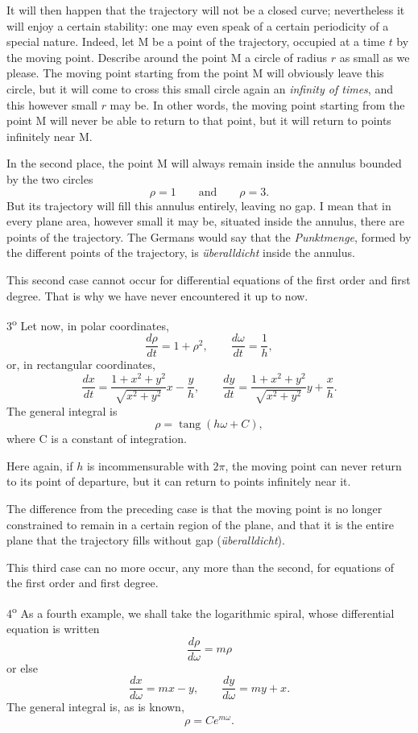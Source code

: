\documentclass[11pt]{article}
\begin{document}
It will then happen that the trajectory will not be a closed curve; nevertheless it will enjoy a certain stability: one may even speak of a certain periodicity of a special nature. Indeed, let M be a point of the trajectory, occupied at a time $t$ by the moving point. Describe around the point M a circle of radius $r$ as small as we please. The moving point starting from the point M will obviously leave this circle, but it will come to cross this small circle again an \emph{infinity of times}, and this however small $r$ may be. In other words, the moving point starting from the point M will never be able to return to that point, but it will return to points infinitely near M.

In the second place, the point M will always remain inside the annulus bounded by the two circles
\[
\rho=1\qquad\text{and}\qquad \rho=3.
\]
But its trajectory will fill this annulus entirely, leaving no gap. I mean that in every plane area, however small it may be, situated inside the annulus, there are points of the trajectory. The Germans would say that the \emph{Punktmenge}, formed by the different points of the trajectory, is \emph{überalldicht} inside the annulus.

This second case cannot occur for differential equations of the first order and first degree. That is why we have never encountered it up to now.

3\textsuperscript{o} Let now, in polar coordinates,
\[
\frac{d\rho}{dt}=1+\rho^2,
\qquad
\frac{d\omega}{dt}=\frac{1}{h},
\]
or, in rectangular coordinates,
\[
\frac{dx}{dt}=\frac{1+x^2+y^2}{\sqrt{x^2+y^2}}x-\frac{y}{h},
\qquad
\frac{dy}{dt}=\frac{1+x^2+y^2}{\sqrt{x^2+y^2}}y+\frac{x}{h}.
\]
The general integral is
\[
\rho=\operatorname{tang}(h\omega+C),
\]
where C is a constant of integration.

Here again, if $h$ is incommensurable with $2\pi$, the moving point can never return to its point of departure, but it can return to points infinitely near it.

The difference from the preceding case is that the moving point is no longer constrained to remain in a certain region of the plane, and that it is the entire plane that the trajectory fills without gap (\emph{überalldicht}).

This third case can no more occur, any more than the second, for equations of the first order and first degree.

4\textsuperscript{o} As a fourth example, we shall take the logarithmic spiral, whose differential equation is written
\[
\frac{d\rho}{d\omega}=m\rho
\]
or else
\[
\frac{dx}{d\omega}=mx-y,
\qquad
\frac{dy}{d\omega}=my+x.
\]
The general integral is, as is known,
\[
\rho=Ce^{m\omega}.
\]
\end{document}
